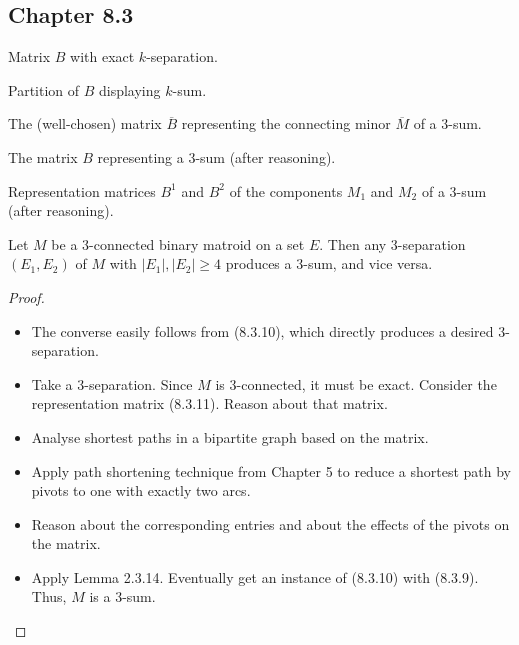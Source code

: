 \subsection{Chapter 8.3}

\begin{proposition}[8.3.1] %
  \label{prop:8.3.1}
  Matrix $B$ with exact $k$-separation.
\end{proposition}

\begin{proposition}[8.3.2] %
  \label{prop:8.3.2}
  Partition of $B$ displaying $k$-sum.
\end{proposition}

\begin{proposition}[8.3.9] %
  \label{prop:8.3.9}
  The (well-chosen) matrix $\overline{B}$ representing the connecting minor $\overline{M}$ of a $3$-sum.
\end{proposition}

\begin{proposition}[8.3.10] %
  \label{prop:8.3.10}
  The matrix $B$ representing a $3$-sum (after reasoning).
\end{proposition}

\begin{proposition}[8.3.11]
  \label{prop:8.3.11}
  Representation matrices $B^{1}$ and $B^{2}$ of the components $M_{1}$ and $M_{2}$ of a $3$-sum (after reasoning).
\end{proposition}

\begin{lemma}[8.3.12]
  \label{lem:8.3.12}
  Let $M$ be a $3$-connected binary matroid on a set $E$. Then any $3$-separation $(E_{1}, E_{2})$ of $M$ with $|E_{1}|, |E_{2}| \geq 4$ produces a $3$-sum, and vice versa.
\end{lemma}

\begin{proof}
  \begin{itemize}
    \item The converse easily follows from (8.3.10), which directly produces a desired $3$-separation.
    \item Take a $3$-separation. Since $M$ is $3$-connected, it must be exact. Consider the representation matrix (8.3.11). Reason about that matrix.
    \item Analyse shortest paths in a bipartite graph based on the matrix.
    \item Apply path shortening technique from Chapter 5 to reduce a shortest path by pivots to one with exactly two arcs.
    \item Reason about the corresponding entries and about the effects of the pivots on the matrix.
    \item Apply Lemma 2.3.14. Eventually get an instance of (8.3.10) with (8.3.9). Thus, $M$ is a $3$-sum.
  \end{itemize}
\end{proof}



